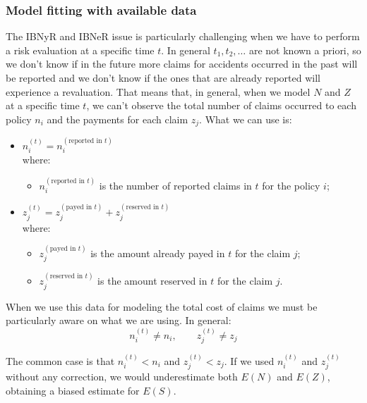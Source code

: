 \documentclass[a4paper, nobind]{templates/ociamthesis}
\providecommand{\tightlist}{%
  \setlength{\itemsep}{0pt}\setlength{\parskip}{0pt}}
\theoremstyle{definition}
\theoremstyle{definition}
\theoremstyle{definition}
\theoremstyle{remark}
\begin{document}
\hypertarget{model-fitting-with-available-data}{%
\subsubsection{Model fitting with available data}\label{model-fitting-with-available-data}}

The IBNyR and IBNeR issue is particularly challenging when we have to perform a risk evaluation at a specific time \(t\). In general \(t_1, t_2,\dots\) are not known a priori, so we don't know if in the future more claims for accidents occurred in the past will be reported and we don't know if the ones that are already reported will experience a revaluation. That means that, in general, when we model \(N\) and \(Z\) at a specific time \(t\), we can't observe the total number of claims occurred to each policy \(n_i\) and the payments for each claim \(z_j\). What we can use is:

\begin{itemize}
\tightlist
\item
  \(n_i^{(t)} = n_i^{(\text{reported in } t)}\)\\
  where:

  \begin{itemize}
  \tightlist
  \item
    \(n_i^{(\text{reported in } t)}\) is the number of reported claims in \(t\) for the policy \(i\);
  \end{itemize}
\item
  \(z_j^{(t)} = z_j^{(\text{payed in }t)} + z_j^{(\text{reserved in } t)}\)\\
  where:

  \begin{itemize}
  \tightlist
  \item
    \(z_j^{(\text{payed in }t)}\) is the amount already payed in \(t\) for the claim \(j\);
  \item
    \(z_j^{(\text{reserved in } t)}\) is the amount reserved in \(t\) for the claim \(j\).
  \end{itemize}
\end{itemize}

When we use this data for modeling the total cost of claims we must be particularly aware on what we are using. In general:
\[
n_i^{(t)} \ne n_i, \qquad z_j^{(t)} \ne z_j
\]

The common case is that \(n_i^{(t)} < n_i\) and \(z_j^{(t)} < z_j\). If we used \(n_i^{(t)}\) and \(z_j^{(t)}\) without any correction, we would underestimate both \(E(N)\) and \(E(Z)\), obtaining a biased estimate for \(E(S)\).
\end{document}
